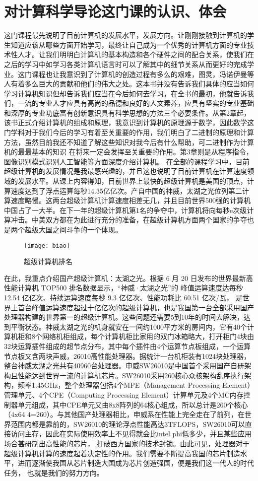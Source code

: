 \documentclass{article}
\begin{document}
\section{对计算科学导论这门课的认识、体会}
这门课程最先说明了目前计算机的发展水平，发展方向。让刚刚接触到计算机的学生知道应该从哪些方面开始学习，最终让自己成为一个优秀的计算机方面的专业技术性人才。让我们明明白计算机的基本构造和各个硬件之间的配合关系，使我们在之后的学习中如学习各类计算机语言时可以了解其中的细节关系从而更好的完成学业。这门课程也让我意识到了计算机的创造过程有多么的艰难，图灵，冯诺伊曼等人有着多么巨大的贡献和他们的伟大之处。这本书并没有告诉我们具体的应当如何学习计算机知识但却告诉我们应当在今后如何去学习，在全书的最初，他就告诉我们，一流的专业人才应具有高尚的品德和良好的人文素养，应具有坚实的专业基础和深厚的专业功底富有创新意识具有科学思想的方法三个必要条件。从第2章起，该书正式介绍计算机的组成和原理，我意识到计算机的原理源于数学，因此数学这门学科对于我们今后的学习有着至关重要的作用，我们明白了二进制的原理和计算方法，虽然目前我还不知道了解这些知识对我今后有什么帮助，可二进制作为计算机的最最基本的知识 在将来一定会发挥至关重要的作用。第3章则是从程序指令，图像识别模式识别人工智能等方面深度介绍计算机。
在全部的课程学习中，目前超级计算机的发展情况是我最感兴趣的，并且这也说明了目前计算机在计算速度领域的发展水平。从课上内容得知，目前世界上最快的超级计算机是美国的顶点，计算速度达到了浮点运算每秒14.35亿亿次。产自中国的神威，太湖之光位列第二计算速度略慢。这两台超级计算机计算速度相差无几，并且目前世界500强的计算机中国占了一大半。在下一年的超级计算机第1名的争夺中，计算机将向每秒e次级计算冲击。中美双方都在为此进行充分的准备，在超级计算机方面两个国家的争夺也是两个超级大国之间斗争的一个体现。\par
\newpage
\begin{figure}[h]
	\centering
	\texttt{[image: biao]}
	\caption{超级计算机排名}
\end{figure}
在此，我重点介绍国产超级计算机：太湖之光。根据 6 月 20 日发布的世界最新高性能计算机 TOP500 排名数据显示，“神威·太湖之光”的 峰值运算速度达每秒 12.54 亿亿次、持续运算速度每秒 9.3 亿亿次、性能功耗比 60.51 亿次/瓦， 是世界上首台峰值运算速度超过十亿亿次的超级计算机，也是我国第一台全部采用国产处理器构建的世界第一的超级计算机。这些问题还需要5到10年的时间去解决，达到平衡状态。神威太湖之光的机身就安在一间约1000平方米的房间内，它有40个计算机柜和8个网络机柜组成，每个计算机柜比家用的双门冰箱略大，打开柜门4块由32块运算插件组成的超节点分布，其中每个插件由4个运算节点板组成，一个运算节点板又含两块声威，26010高性能处理器。据统计一台机柜装有1024块处理器，整台神威太湖之光共有40960台处理器。申威SW26010是中国首个采用国产自研架构且性能达到世界一流的计算机芯片。SW26010采用260核心众核架构乱序执行架构，频率1.45GHz，整个处理器包括4个MPE（Management Processing Element）管理单元、4个CPE（Computing Processing Element）计算单元及4个MC内存控制器单元组成，其中CPE单元又由8x8阵列的64核心组成，所以总计是260个核心（4x64 4=260）。与其他国产处理器相比，申威系在性能上完全走在了前列，在世界范围内都是靠前的，SW26010的理论浮点性能高达3TFLOPS，SW26010可以直接访问主存，因此在实际使用效率上不见得就会比intel phi低多少，并且某些应用场合甚研制出高性能的芯片， 打破西方国家的技术封锁。由此可见，处理器对于超级计算机计算的速度起着决定性的作用。我们需要不断提高我国的芯片制造水平，进而逐渐使我国从芯片制造大国成为芯片创造强国，便是我们这一代人的时代任务， 也就是我们的努力方向。
\end{document}
